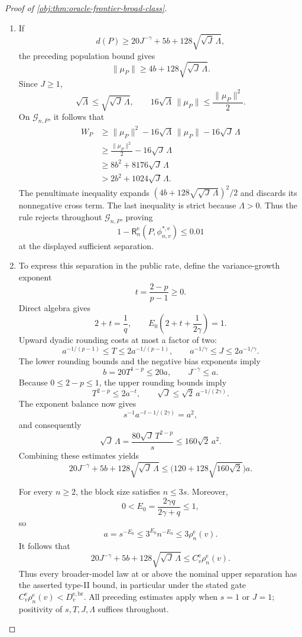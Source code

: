 \begin{proof}[Proof of \cref{obj:thm:oracle-frontier-broad-class}]
\begin{enumerate}
\item If
\[
d(P)\ge20J^{-\gamma}+5b+128\sqrt{\sqrt J\,\Lambda},
\]
the preceding population bound gives
\[
\|\mu_P\|\ge4b+128\sqrt{\sqrt J\,\Lambda}.
\]
Since \(J\ge1\),
\[
\sqrt\Lambda\le\sqrt{\sqrt J\,\Lambda},
\qquad
16\sqrt\Lambda\,\|\mu_P\|\le\frac{\|\mu_P\|^2}{2}.
\]
On \(\mathcal G_{n,P}\), it follows that
\[
\begin{aligned}
W_P
&\ge\|\mu_P\|^2
-16\sqrt\Lambda\,\|\mu_P\|-16\sqrt J\,\Lambda\\
&\ge\frac{\|\mu_P\|^2}{2}-16\sqrt J\,\Lambda\\
&\ge8b^2+8176\sqrt J\,\Lambda\\
&>2b^2+1024\sqrt J\,\Lambda.
\end{aligned}
\]
The penultimate inequality expands
\((4b+128\sqrt{\sqrt J\,\Lambda})^2/2\) and discards its nonnegative cross term. The last inequality is strict because \(\Lambda>0\). Thus the rule rejects throughout \(\mathcal G_{n,P}\), proving
\[
1-\mathsf R_n^{\mathrm e}(P,\phi^{*,\mathrm e}_{n,v})\le0.01
\]
at the displayed sufficient separation.

\item To express this separation in the public rate, define the variance-growth exponent
\[
t=\frac{2-p}{p-1}\ge0.
\]
Direct algebra gives
\[
2+t=\frac1q,
\qquad
E_0\left(2+t+\frac1{2\gamma}\right)=1.
\]
Upward dyadic rounding costs at most a factor of two:
\[
a^{-1/(p-1)}\le T\le2a^{-1/(p-1)},
\qquad
a^{-1/\gamma}\le J\le2a^{-1/\gamma}.
\]
The lower rounding bounds and the negative bias exponents imply
\[
b=20T^{1-p}\le20a,
\qquad
J^{-\gamma}\le a.
\]
Because \(0\le2-p\le1\), the upper rounding bounds imply
\[
T^{2-p}\le2a^{-t},
\qquad
\sqrt J\le\sqrt2\,a^{-1/(2\gamma)}.
\]
The exponent balance now gives
\[
s^{-1}a^{-t-1/(2\gamma)}=a^2,
\]
and consequently
\[
\sqrt J\,\Lambda
=\frac{80\sqrt J\,T^{2-p}}s
\le160\sqrt2\,a^2.
\]
Combining these estimates yields
\[
20J^{-\gamma}+5b+128\sqrt{\sqrt J\,\Lambda}
\le
\bigl(120+128\sqrt{160\sqrt2}\bigr)a.
\]

For every \(n\ge2\), the block size satisfies \(n\le3s\). Moreover,
\[
0<E_0=\frac{2\gamma q}{2\gamma+q}\le1,
\]
so
\[
a=s^{-E_0}
\le3^{E_0}n^{-E_0}
\le3\rho_n^{\mathrm e}(v).
\]
It follows that
\[
20J^{-\gamma}+5b+128\sqrt{\sqrt J\,\Lambda}
\le C_v^{\mathrm e}\rho_n^{\mathrm e}(v).
\]
Thus every broader-model law at or above the nominal upper separation has the asserted type-II bound, in particular under the stated gate
\(C_v^{\mathrm e}\rho_n^{\mathrm e}(v)<D_v^{\mathrm{e,br}}\).
All preceding estimates apply when \(s=1\) or \(J=1\); positivity of \(s,T,J,\Lambda\) suffices throughout.


\end{enumerate}
\end{proof}
